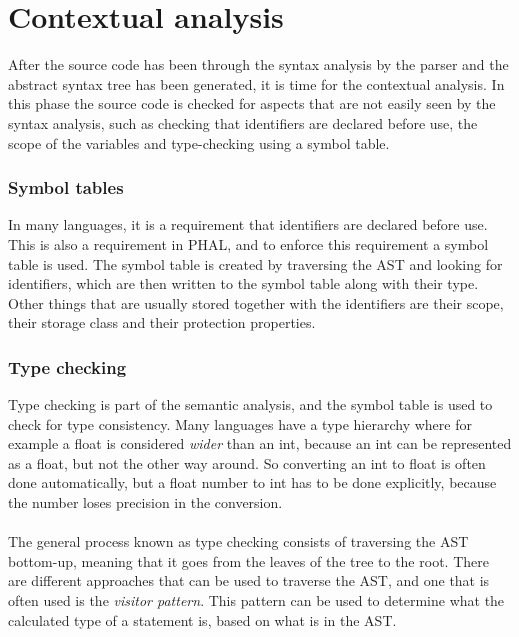 \section{Contextual analysis}\label{comp:ContextualA}
After the source code has been through the syntax analysis by the parser and the abstract syntax tree has been generated, it is time for the contextual analysis. In this phase the source code is checked for aspects that are not easily seen by the syntax analysis, such as checking that identifiers are declared before use, the scope of the variables and type-checking using a symbol table. 
\subsubsection{Symbol tables}
In many languages, it is a requirement that identifiers are declared before use. This is also a requirement in PHAL, and to enforce this requirement a symbol table is used. The symbol table is created by traversing the AST and looking for identifiers, which are then written to the symbol table along with their type. Other things that are usually stored together with the identifiers are their scope, their storage class and their protection properties.

\subsubsection{Type checking}
Type checking is part of the semantic analysis, and the symbol table is used to check for type consistency. 
Many languages have a type hierarchy where for example a float is considered \textit{wider} than an int, because an int can be represented as a float, but not the other way around. So converting an int to float is often done automatically, but a float number to int has to be done explicitly, because the number loses precision in the conversion.
\\\\
The general process known as type checking consists of traversing the AST bottom-up, meaning that it goes from the leaves of the tree to the root. There are different approaches that can be used to traverse the AST, and one that is often used is the \textit{visitor pattern}. This pattern can be used to determine what the calculated type of a statement is, based on what is in the AST. 

